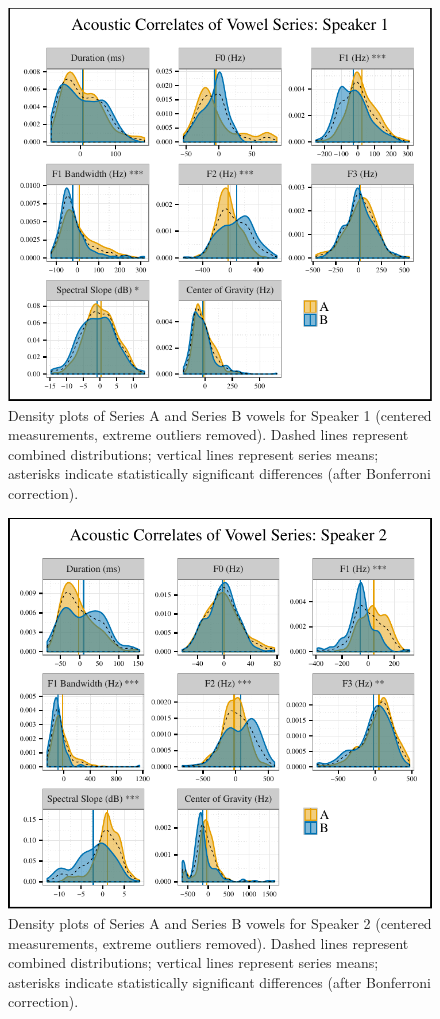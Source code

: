 \documentclass[output=paper,newtxmath,modfonts,nonflat,hidelinks]{langsci/langscibook}
\begin{document}
\begin{figure}[p]
\includegraphics[height=.35\textheight]{figures/s1-correlates.pdf}
\caption{Density plots of Series A and Series B vowels for Speaker 1 (centered measurements, extreme outliers removed).  Dashed lines represent combined distributions; vertical lines represent series means; asterisks indicate statistically significant differences (after Bonferroni correction).}
\label{fig:kbgy:1}
\end{figure}



\begin{figure}[p]
\includegraphics[height=.35\textheight]{figures/s2-correlates.pdf}
\caption{Density plots of Series A and Series B vowels for Speaker 2 (centered measurements, extreme outliers removed).  Dashed lines represent combined distributions; vertical lines represent series means; asterisks indicate statistically significant differences (after Bonferroni correction).}
\label{fig:kbgy:2}
\end{figure}
\end{document}
